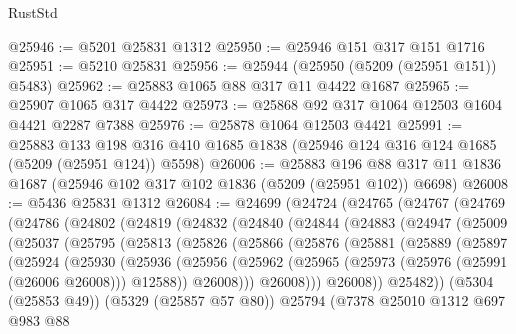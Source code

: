 \begin{lexlean}{RustStd}
\begin{coremodule}
@25946 := @5201 @25831 @1312
@25950 := @25946 @151 @317 @151 @1716
@25951 := @5210 @25831
@25956 := @25944 (@25950 (@5209 (@25951 @151)) @5483)
@25962 := @25883 @1065 @88 @317 @11 @4422 @1687
@25965 := @25907 @1065 @317 @4422
@25973 := @25868 @92 @317 @1064 @12503 @1604 @4421 @2287 @7388
@25976 := @25878 @1064 @12503 @4421
@25991 := @25883
    @133
    @198
    @316
    @410
    @1685
    @1838
    (@25946 @124 @316 @124 @1685 (@5209 (@25951 @124)) @5598)
@26006 := @25883
    @196
    @88
    @317
    @11
    @1836
    @1687
    (@25946 @102 @317 @102 @1836 (@5209 (@25951 @102)) @6698)
@26008 := @5436 @25831 @1312
@26084 := @24699
    (@24724
      (@24765
        (@24767
          (@24769
            (@24786
              (@24802
                (@24819
                  (@24832
                    (@24840
                      (@24844
                        (@24883
                          (@24947
                            (@25009
                              (@25037
                                (@25795
                                  (@25813
                                    (@25826
                                      (@25866
                                        (@25876
                                          (@25881
                                            (@25889
                                              (@25897
                                                (@25924
                                                  (@25930
                                                    (@25936
                                                      (@25956
                                                        (@25962
                                                          (@25965
                                                            (@25973
                                                              (@25976 (@25991 (@26006 @26008)))
                                                              @12588))
                                                          @26008)))
                                                    @26008)))
                                              @26008))
                                          @25482))
                                      (@5304 (@25853 @49))
                                      (@5329 (@25857 @57 @80))
                                      @25794
                                      (@7378
                                        @25010
                                        @1312
                                        @697
                                        @983
                                        @88

\end{coremodule}
\end{lexlean}
